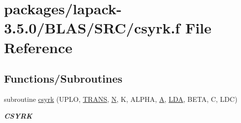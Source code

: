 \hypertarget{lapack-3_85_80_2BLAS_2SRC_2csyrk_8f}{}\section{packages/lapack-\/3.5.0/\+B\+L\+A\+S/\+S\+R\+C/csyrk.f File Reference}
\label{lapack-3_85_80_2BLAS_2SRC_2csyrk_8f}
\subsection*{Functions/\+Subroutines}
\begin{DoxyCompactItemize}
\item 
subroutine \hyperlink{group__complex__blas__level3_ga1b4f63daf04fdf3061bd25dfec0d3e84}{csyrk} (U\+P\+L\+O, \hyperlink{superlu__enum__consts_8h_a0c4e17b2d5cea33f9991ccc6a6678d62a1f61e3015bfe0f0c2c3fda4c5a0cdf58}{T\+R\+A\+N\+S}, \hyperlink{polmisc_8c_a0240ac851181b84ac374872dc5434ee4}{N}, K, A\+L\+P\+H\+A, \hyperlink{classA}{A}, \hyperlink{example__user_8c_ae946da542ce0db94dced19b2ecefd1aa}{L\+D\+A}, B\+E\+T\+A, C, L\+D\+C)
\begin{DoxyCompactList}\small\item\em {\bfseries C\+S\+Y\+R\+K} \end{DoxyCompactList}\end{DoxyCompactItemize}
